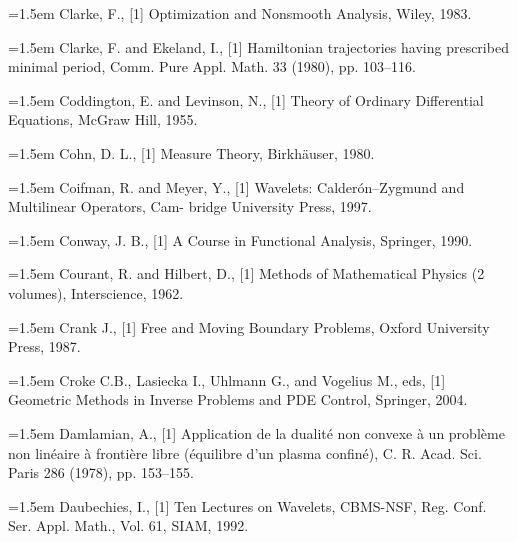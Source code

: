 \noindent\hangindent=1.5em Clarke, F., \hypertarget{ref:Clarke-1}{[1]} Optimization and Nonsmooth Analysis, Wiley, 1983.\par{}
\noindent\hangindent=1.5em Clarke, F. and Ekeland, I., \hypertarget{ref:ClarkeEkeland-1}{[1]} Hamiltonian trajectories having prescribed minimal period, Comm. Pure Appl. Math. 33 (1980), pp. 103--116.\par{}
\noindent\hangindent=1.5em Coddington, E. and Levinson, N., \hypertarget{ref:CoddingtonLevinson-1}{[1]} Theory of Ordinary Differential Equations, McGraw Hill, 1955.\par{}
\noindent\hangindent=1.5em Cohn, D. L., \hypertarget{ref:Cohn-1}{[1]} Measure Theory, Birkhäuser, 1980.\par{}
\noindent\hangindent=1.5em Coifman, R. and Meyer, Y., \hypertarget{ref:CoifmanMeyer-1}{[1]} Wavelets: Calderón--Zygmund and Multilinear Operators, Cam- bridge University Press, 1997.\par{}
\noindent\hangindent=1.5em Conway, J. B., \hypertarget{ref:Conway-1}{[1]} A Course in Functional Analysis, Springer, 1990.\par{}
\noindent\hangindent=1.5em Courant, R. and Hilbert, D., \hypertarget{ref:CourantHilbert-1}{[1]} Methods of Mathematical Physics (2 volumes), Interscience, 1962.\par{}
\noindent\hangindent=1.5em Crank J., \hypertarget{ref:Crank-1}{[1]} Free and Moving Boundary Problems, Oxford University Press, 1987.\par{}
\noindent\hangindent=1.5em Croke C.B., Lasiecka I., Uhlmann G., and Vogelius M., eds, \hypertarget{ref:CrokeEtAl-1}{[1]} Geometric Methods in Inverse Problems and PDE Control, Springer, 2004.\par{}
\noindent\hangindent=1.5em Damlamian, A., \hypertarget{ref:Damlamian-1}{[1]} Application de la dualité non convexe à un problème non linéaire à frontière libre (équilibre d'un plasma confiné), C. R. Acad. Sci. Paris 286 (1978), pp. 153--155.\par{}
\noindent\hangindent=1.5em Daubechies, I., \hypertarget{ref:Daubechies-1}{[1]} Ten Lectures on Wavelets, CBMS-NSF, Reg. Conf. Ser. Appl. Math., Vol. 61, SIAM, 1992.\par{}

